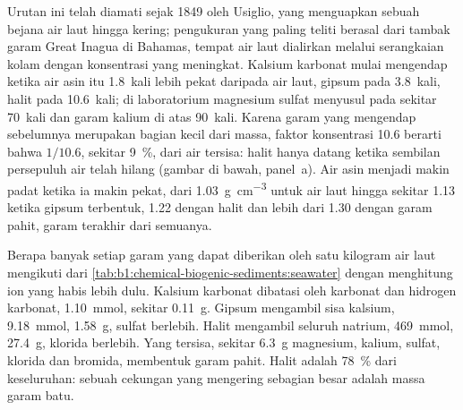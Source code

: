 Urutan ini telah diamati sejak 1849 oleh Usiglio, yang menguapkan sebuah bejana air laut hingga kering; pengukuran yang paling teliti berasal dari tambak garam Great Inagua di Bahamas, tempat air laut dialirkan melalui serangkaian kolam dengan konsentrasi yang meningkat. Kalsium karbonat mulai mengendap ketika air asin itu 1.8~kali lebih pekat daripada air laut, gipsum pada 3.8~kali, halit pada 10.6~kali; di laboratorium magnesium sulfat menyusul pada sekitar 70~kali dan garam kalium di atas 90~kali. Karena garam yang mengendap sebelumnya merupakan bagian kecil dari massa, faktor konsentrasi 10.6 berarti bahwa $1/10.6$, sekitar \qty{9}{\%}, dari air tersisa: halit hanya datang ketika sembilan persepuluh air telah hilang (gambar di bawah, panel~a). Air asin menjadi makin padat ketika ia makin pekat, dari \qty{1.03}{g.cm^{-3}} untuk air laut hingga sekitar \num{1.13} ketika gipsum terbentuk, \num{1.22} dengan halit dan lebih dari \num{1.30} dengan garam pahit, garam terakhir dari semuanya.

Berapa banyak setiap garam yang dapat diberikan oleh satu kilogram air laut mengikuti dari \cref{tab:b1:chemical-biogenic-sediments:seawater} dengan menghitung ion yang habis lebih dulu. Kalsium karbonat dibatasi oleh karbonat dan hidrogen karbonat,
\qty{1.10}{mmol}, sekitar \qty{0.11}{g}. Gipsum mengambil sisa kalsium, \qty{9.18}{mmol}, \qty{1.58}{g}, sulfat berlebih. Halit mengambil seluruh natrium, \qty{469}{mmol}, \qty{27.4}{g}, klorida berlebih. Yang tersisa, sekitar \qty{6.3}{g} magnesium, kalium, sulfat, klorida dan bromida, membentuk garam pahit. Halit adalah \qty{78}{\%} dari keseluruhan: sebuah cekungan  yang mengering sebagian besar adalah massa garam batu.

